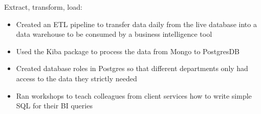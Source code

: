 \item Extract, transform, load:
\begin{itemize}%
    \item Created an ETL pipeline to transfer data daily from the live database into a data warehouse to be consumed by a business intelligence tool
    \item Used the Kiba package to process the data from Mongo to PostgresDB
    \item Created database roles in Postgres so that different departments only had access to the data they strictly needed
    \item Ran workshops to teach colleagues from client services how to write simple SQL for their BI queries
\end{itemize}
